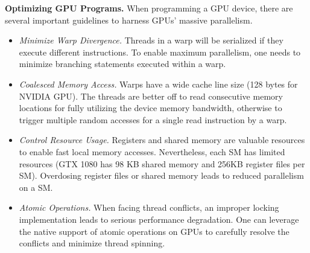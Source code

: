 \vspace{1mm}\noindent\textbf{Optimizing GPU Programs.}
When programming a GPU device, there are several important guidelines to harness GPUs' massive parallelism.
\begin{itemize}
	\item \emph{Minimize Warp Divergence.} Threads in a warp will be serialized if they execute different instructions. To enable maximum parallelism, one needs to minimize branching statements executed within a warp.  
	\item \emph{Coalesced Memory Access.} Warps have a wide cache line size (128 bytes for NVIDIA GPU). The threads are better off to read consecutive memory locations for fully utilizing the device memory bandwidth, otherwise to trigger multiple random accesses for a single read instruction by a warp. 
	\item \emph{Control Resource Usage.} Registers and shared memory are valuable resources to enable fast local memory accesses. Nevertheless, each SM has limited resources (GTX 1080 has 98 KB shared memory and 256KB register files per SM). Overdosing register files or shared memory leads to reduced parallelism on a SM.  
	\item \emph{Atomic Operations.} When facing thread conflicts, an improper locking implementation leads to serious performance degradation. One can leverage the native support of atomic operations \cite{sanders2010cuda} on GPUs to carefully resolve the conflicts and minimize thread spinning.
\end{itemize}